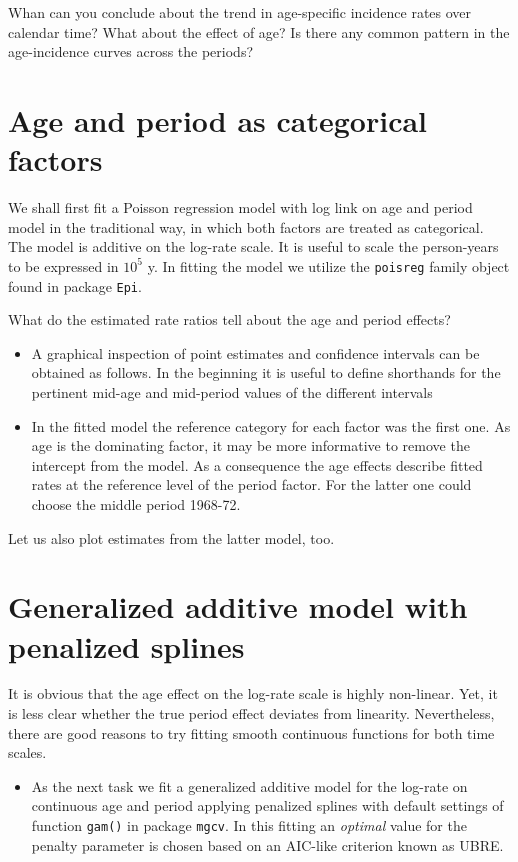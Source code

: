 \documentclass[
]{book}
\providecommand{\tightlist}{%
  \setlength{\itemsep}{0pt}\setlength{\parskip}{0pt}}
\begin{document}
Whan can you conclude about the trend in age-specific incidence rates
over calendar time? What about the effect of age?
Is there any common pattern in the age-incidence curves across the periods?

\section{Age and period as categorical factors}\label{age-and-period-as-categorical-factors}

We shall first fit a Poisson regression model with log link
on age and period model in the traditional way,
in which both factors are treated as categorical.
The model is additive on the log-rate scale.
It is useful to scale the person-years to be expressed in \(10^5\) y.
In fitting the model we utilize the \texttt{poisreg} family object
found in package \texttt{Epi}.

What do the estimated rate ratios tell about the age and period effects?

\begin{itemize}
\item
  A graphical inspection of point estimates and confidence
  intervals can be obtained as follows. In the beginning it is useful
  to define shorthands for the pertinent mid-age and mid-period values
  of the different intervals
\item
  In the fitted model the reference category for each factor was
  the first one. As age is the dominating factor, it may be more
  informative to remove the intercept from the model. As a
  consequence the age effects describe fitted rates at the reference
  level of the period factor. For the latter one could choose the
  middle period 1968-72.
\end{itemize}

Let us also plot estimates from the latter model, too.

\section{Generalized additive model with penalized splines}\label{generalized-additive-model-with-penalized-splines}

It is obvious that the age effect on the log-rate scale is highly
non-linear. Yet, it is less clear whether the true period effect
deviates from linearity. Nevertheless, there are good reasons to
try fitting smooth continuous functions for both time scales.

\begin{itemize}
\tightlist
\item
  As the next task we fit a generalized additive model for the
  log-rate on continuous age and period applying penalized splines
  with default settings of function \texttt{gam()} in package
  \texttt{mgcv}. In this fitting an \emph{optimal} value for the penalty
  parameter is chosen based on an AIC-like criterion known as UBRE.
\end{itemize}
\end{document}
